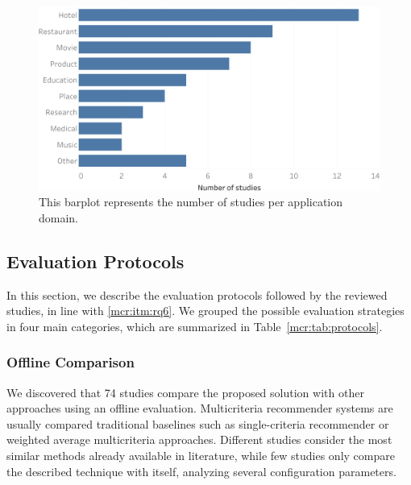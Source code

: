 
\begin{figure}
\centering
\includegraphics[width=\textwidth]{domain_per_study}
\caption[Studies per application domain]{This barplot represents the number of studies per application domain.}
\label{mcr:fig:domain-per-study}
\end{figure}

\subsection{Evaluation Protocols}
\label{mcr:sec:protocols}

In this section, we describe the evaluation protocols followed by the reviewed studies, in line with \ref{mcr:itm:rq6}. We grouped the possible evaluation strategies in four main categories, which are summarized in Table~\ref{mcr:tab:protocols}.

\subsubsection{Offline Comparison}

We discovered that 74 studies compare the proposed solution with other approaches using an offline evaluation. Multicriteria recommender systems are usually compared  traditional baselines such as single-criteria recommender or weighted average multicriteria approaches. Different studies consider the most similar methods already available in literature, while few studies only compare the described technique with itself, analyzing several configuration parameters.

